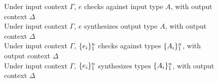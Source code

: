 \documentclass[12pt]{article}
\begin{document}
\begin{figure}[htbp]
    {Under input context $\Gamma$, $e$ checks against input type $A$,
    with output context $\Delta$} \\[1ex]
    {Under input context $\Gamma$, $e$ synthesizes output type $A$,
    with output context $\Delta$} \\[1ex]
    {Under input context $\Gamma$, $\{ {e}_i \}_1^{n}$ checks against types $\{ {A}_i \}_1^{n}$,
    with output context $\Delta$} \\[1ex]
    {Under input context $\Gamma$, $\{ {e}_i \}_1^{n}$ synthesizes types $\{ {A}_i \}_1^{n}$,
    with output context $\Delta$} \\[1ex]


\end{figure}
\end{document}
